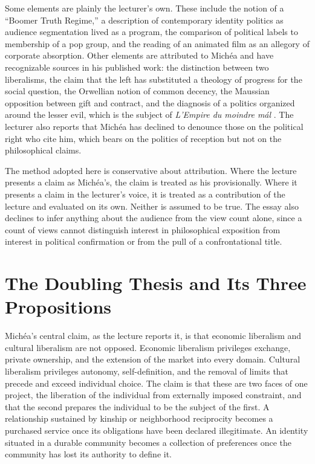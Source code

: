 \documentclass[12pt]{article}
\begin{document}
Some elements are plainly the lecturer's own. These include the notion of a ``Boomer Truth Regime,'' a description of contemporary identity politics as audience segmentation lived as a program, the comparison of political labels to membership of a pop group, and the reading of an animated film as an allegory of corporate absorption. Other elements are attributed to Michéa and have recognizable sources in his published work: the distinction between two liberalisms, the claim that the left has substituted a theology of progress for the social question, the Orwellian notion of common decency, the Maussian opposition between gift and contract, and the diagnosis of a politics organized around the lesser evil, which is the subject of \emph{L'Empire du moindre m\'al} \citep{michea}. The lecturer also reports that Michéa has declined to denounce those on the political right who cite him, which bears on the politics of reception but not on the philosophical claims.

The method adopted here is conservative about attribution. Where the lecture presents a claim as Michéa's, the claim is treated as his provisionally. Where it presents a claim in the lecturer's voice, it is treated as a contribution of the lecture and evaluated on its own. Neither is assumed to be true. The essay also declines to infer anything about the audience from the view count alone, since a count of views cannot distinguish interest in philosophical exposition from interest in political confirmation or from the pull of a confrontational title.

\section{The Doubling Thesis and Its Three Propositions}
\label{sec:doubling}

Michéa's central claim, as the lecture reports it, is that economic liberalism and cultural liberalism are not opposed. Economic liberalism privileges exchange, private ownership, and the extension of the market into every domain. Cultural liberalism privileges autonomy, self-definition, and the removal of limits that precede and exceed individual choice. The claim is that these are two faces of one project, the liberation of the individual from externally imposed constraint, and that the second prepares the individual to be the subject of the first. A relationship sustained by kinship or neighborhood reciprocity becomes a purchased service once its obligations have been declared illegitimate. An identity situated in a durable community becomes a collection of preferences once the community has lost its authority to define it.
\end{document}
